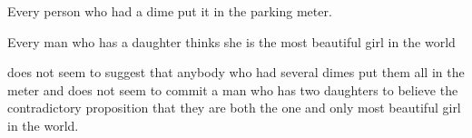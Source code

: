 \begin{ex} 
\begin{subex} 
 
\item Every person who had a dime put it in the parking
  meter. \citep{PelletierSchubert1989} 
 
\item Every man who has a daughter thinks she is the most beautiful
  girl in the world \citep{Cooper1979} 
 
\end{subex} 
   
\end{ex} 
 does not seem to suggest that anybody who had several dimes
put them all in the meter and  does not seem to
commit a man who has two daughters to believe the contradictory
proposition that they are both the one and only most beautiful girl in
the world.
%
%
